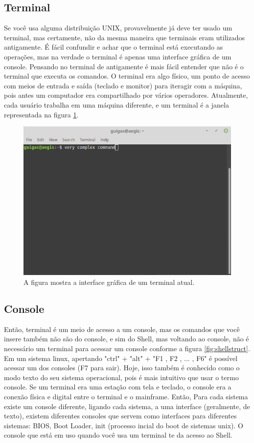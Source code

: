 \documentclass[oneside, 11 pt]{article}
\begin{document}
	\subsection{Terminal}
	Se você usa alguma distribuição UNIX, provavelmente já deve ter usado um terminal, mas certamente, não da mesma maneira que terminais eram utilizados antigamente. É fácil confundir e achar que o terminal está executando as operações, mas na verdade o terminal é apenas uma interface gráfica de um console. Pensando no terminal de antigamente é mais fácil entender que não é o terminal que executa os comandos. O terminal era algo físico, um ponto de acesso com meios de entrada e saída (teclado e monitor) para iteragir com a máquina, pois antes um computador era compartilhado por vários operadores.
	Atualmente, cada usuário trabalha em uma máquina diferente, e um terminal é a janela representada na figura \ref*{fig:term1}.
	\begin{figure}[h]
		\includegraphics[width=\linewidth]{term2.png}
		\caption{A figura mostra a interface gráfica de um terminal atual.}
		\label{fig:term1}
	\end{figure}
	\subsection{Console}
	Então, terminal é um meio de acesso a um console, mas os comandos que você insere também não são do console, e sim do Shell, mas voltando ao console, não é necessário um terminal para acessar um console conforme a figura \ref*{fig:shellstruct}. Em um sistema linux, apertando "ctrl" + "alt" + "F1 , F2 , ... , F6" é possível acessar um dos consoles (F7 para sair). Hoje, isso também é conhecido como o modo texto do seu sistema operacional, pois é mais intuitivo que usar o termo console. Se um terminal era uma estação com tela e teclado, o console era a conexão física e digital entre o terminal e o mainframe. Então, Para cada sistema existe um console diferente, ligando cada sistema, a uma interface (geralmente, de texto), existem diferentes consoles que servem como interfaces para diferentes sistemas: BIOS, Boot Loader, init (processo incial do boot de sistemas unix). O console que está em uso quando você usa um terminal te da acesso ao Shell.
\end{document}
